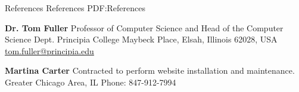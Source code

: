 \documentclass[a4paper,MMMyyyy,nonstopmode]{simpleresumecv}
\begin{document}
\begin{Body}
\Section
{References}
{References}
{PDF:References}

\BulletItem
\textbf{Dr. Tom Fuller}
\newline
Professor of Computer Science and Head of the Computer Science Dept.
\newline
Principia College
 Maybeck Place, Elsah, Illinois 62028, USA
\newline
\href{mailto:tom.fuller@principia.edu}
{tom.fuller@principia.edu}


\BulletItem
\textbf{Martina Carter}
\newline
Contracted to perform website installation and maintenance. 
\newline
Greater Chicago Area, IL
\newline
{Phone: 847-912-7994}

\end{Body}
\end{document}
